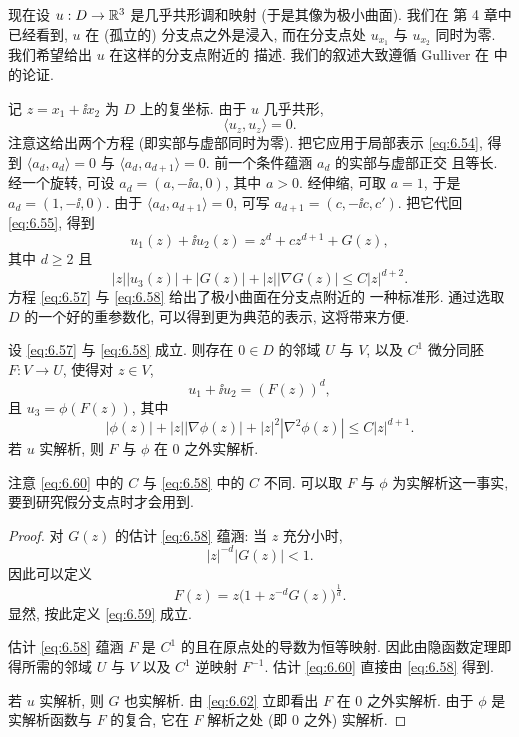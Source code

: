 现在设 $u:D\to\mathbb{R}^3$ 是几乎共形调和映射 (于是其像为极小曲面). 我们在
第 4 章中已经看到, $u$ 在 (孤立的) 分支点之外是浸入, 而在分支点处
$u_{x_1}$ 与 $u_{x_2}$ 同时为零. 我们希望给出 $u$ 在这样的分支点附近的
描述. 我们的叙述大致遵循 Gulliver 在 \cite{Gu} 中的论证.

记 $z=x_1+\ii x_2$ 为 $D$ 上的复坐标. 由于 $u$ 几乎共形,
\begin{equation}
\langle u_z,u_z\rangle=0.
\label{eq:6.56}
\end{equation}
注意这给出两个方程 (即实部与虚部同时为零). 把它应用于局部表示
\eqref{eq:6.54}, 得到 $\langle a_d,a_d\rangle=0$ 与
$\langle a_d,a_{d+1}\rangle=0$. 前一个条件蕴涵 $a_d$ 的实部与虚部正交
且等长. 经一个旋转, 可设 $a_d=(a,-\ii a,0)$, 其中 $a>0$. 经伸缩, 可取
$a=1$, 于是 $a_d=(1,-\ii,0)$. 由于 $\langle a_d,a_{d+1}\rangle=0$,
可写 $a_{d+1}=(c,-\ii c,c')$. 把它代回 \eqref{eq:6.55}, 得到
\begin{equation}
u_1(z)+\ii u_2(z)=z^d+cz^{d+1}+G(z),
\label{eq:6.57}
\end{equation}
其中 $d\geq2$ 且
\begin{equation}
|z|\bigl|u_3(z)\bigr|+|G(z)|+|z|\bigl|\nabla G(z)\bigr|
\leq C|z|^{d+2}.
\label{eq:6.58}
\end{equation}
方程 \eqref{eq:6.57} 与 \eqref{eq:6.58} 给出了极小曲面在分支点附近的
一种标准形. 通过选取 $D$ 的一个好的重参数化, 可以得到更为典范的表示,
这将带来方便.

\begin{lemma}
\label{lem:6.16}
设 \eqref{eq:6.57} 与 \eqref{eq:6.58} 成立. 则存在 $0\in D$ 的邻域
$U$ 与 $V$, 以及 $C^1$ 微分同胚 $F:V\to U$, 使得对 $z\in V$,
\begin{equation}
u_1+\ii u_2=(F(z))^d,
\label{eq:6.59}
\end{equation}
且 $u_3=\phi(F(z))$, 其中
\begin{equation}
|\phi(z)|+|z||\nabla\phi(z)|+|z|^2|\nabla^2\phi(z)|\leq C|z|^{d+1}.
\label{eq:6.60}
\end{equation}
若 $u$ 实解析, 则 $F$ 与 $\phi$ 在 $0$ 之外实解析.
\end{lemma}

注意 \eqref{eq:6.60} 中的 $C$ 与 \eqref{eq:6.58} 中的 $C$ 不同. 可以取
$F$ 与 $\phi$ 为实解析这一事实, 要到研究假分支点时才会用到.

\begin{proof}
对 $G(z)$ 的估计 \eqref{eq:6.58} 蕴涵: 当 $z$ 充分小时,
\begin{equation}
|z|^{-d}|G(z)|<1.
\label{eq:6.61}
\end{equation}
因此可以定义
\begin{equation}
F(z)=z\bigl(1+z^{-d}G(z)\bigr)^{\frac1d}.
\label{eq:6.62}
\end{equation}
显然, 按此定义 \eqref{eq:6.59} 成立.

估计 \eqref{eq:6.58} 蕴涵 $F$ 是 $C^1$ 的且在原点处的导数为恒等映射.
因此由隐函数定理即得所需的邻域 $U$ 与 $V$ 以及 $C^1$ 逆映射 $F^{-1}$.
估计 \eqref{eq:6.60} 直接由 \eqref{eq:6.58} 得到.

若 $u$ 实解析, 则 $G$ 也实解析. 由 \eqref{eq:6.62} 立即看出 $F$ 在 $0$
之外实解析. 由于 $\phi$ 是实解析函数与 $F$ 的复合, 它在 $F$ 解析之处
(即 $0$ 之外) 实解析.
\end{proof}

